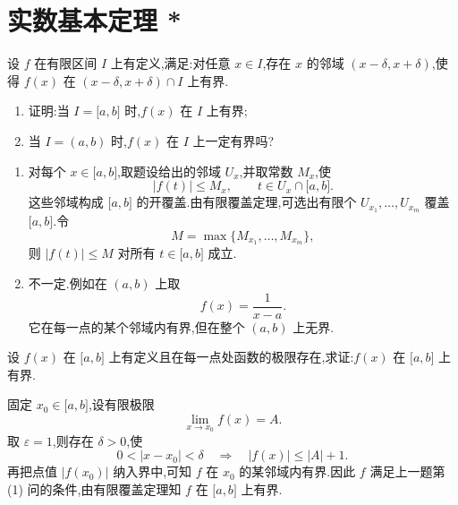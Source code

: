 \newpage

\section{实数基本定理 *}

\begin{example}
    设 $f$ 在有限区间 $I$ 上有定义,满足:对任意 $x\in I$,存在 $x$ 的邻域 $(x-\delta,x+\delta)$,使得 $f(x)$ 在 $(x-\delta,x+\delta)\cap I$ 上有界.
    \begin{enumerate}
        \item 证明:当 $I=\lbrack a,b\rbrack$ 时,$f(x)$ 在 $I$ 上有界;
        \item 当 $I=(a,b)$ 时,$f(x)$ 在 $I$ 上一定有界吗?
    \end{enumerate}
\end{example}
\exampleblank

\begin{solution}
    \begin{enumerate}
        \item 对每个 $x\in\lbrack a,b\rbrack$,取题设给出的邻域 $U_x$,并取常数 $M_x$,使
              \[
                  |f(t)|\leq M_x,
                  \qquad
                  t\in U_x\cap\lbrack a,b\rbrack.
              \]
              这些邻域构成 $\lbrack a,b\rbrack$ 的开覆盖.由有限覆盖定理,可选出有限个
              $U_{x_1},\ldots,U_{x_m}$ 覆盖 $\lbrack a,b\rbrack$.令
              \[
                  M=\max\{M_{x_1},\ldots,M_{x_m}\},
              \]
              则 $|f(t)|\leq M$ 对所有 $t\in\lbrack a,b\rbrack$ 成立.
        \item 不一定.例如在 $(a,b)$ 上取
              \[
                  f(x)=\dfrac{1}{x-a}.
              \]
              它在每一点的某个邻域内有界,但在整个 $(a,b)$ 上无界.
    \end{enumerate}
\end{solution}

\begin{example}
    设 $f(x)$ 在 $\lbrack a,b\rbrack$ 上有定义且在每一点处函数的极限存在,求证:$f(x)$ 在 $\lbrack a,b\rbrack$ 上有界.
\end{example}
\exampleblank

\begin{solution}
    固定 $x_0\in\lbrack a,b\rbrack$,设有限极限
    \[
        \lim\limits_{x\to x_0}f(x)=A.
    \]
    取 $\varepsilon=1$,则存在 $\delta>0$,使
    \[
        0<|x-x_0|<\delta
        \quad\Longrightarrow\quad
        |f(x)|\leq |A|+1.
    \]
    再把点值 $|f(x_0)|$ 纳入界中,可知 $f$ 在 $x_0$ 的某邻域内有界.因此 $f$ 满足上一题第 (1) 问的条件,由有限覆盖定理知 $f$ 在 $\lbrack a,b\rbrack$ 上有界.
\end{solution}

